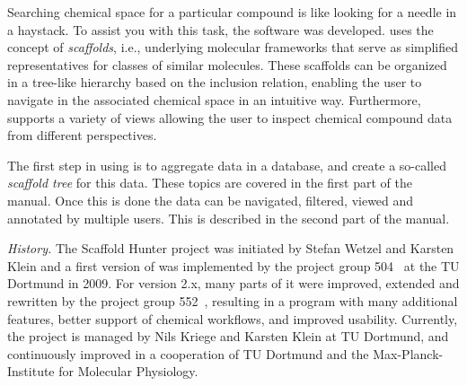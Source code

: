 Searching chemical space for a particular compound is like looking
for a needle in a haystack. To assist you with this task, the software
\emph{\sh} was developed. \sh uses the concept of \emph{scaffolds}, i.e.,
underlying molecular frameworks that serve as simplified representatives for
classes of similar molecules. These scaffolds can be organized in a tree-like
hierarchy based on the inclusion relation, enabling the user to navigate in
the associated chemical space in an intuitive way.
Furthermore, \sh supports a variety of views allowing the user to inspect 
chemical compound data from different perspectives.

The first step in using \sh is to aggregate data in
a database, and create a so-called \emph{scaffold tree} for this data.
These topics are covered in the first part of the manual. Once this
is done the data can be navigated, filtered, viewed and annotated
by multiple users. This is described in the second part of the manual.

\vspace{2.5cm}

\emph{History.} The Scaffold Hunter project was initiated by Stefan Wetzel and Karsten Klein
and a first version of \sh was implemented by the project group 504~\cite{pg504}
at the TU Dortmund in 2009. For version 2.x, many parts of it were improved, extended and rewritten by
the project group 552~\cite{pg552}, resulting in a program with many additional features,
better support of chemical workflows, and improved usability.
Currently, the project is managed by Nils Kriege and Karsten Klein at TU Dortmund, and 
continuously improved in a cooperation of TU Dortmund and the Max-Planck-Institute for Molecular
Physiology.
